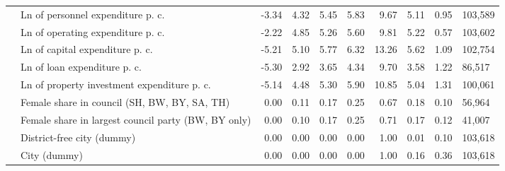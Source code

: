 \begin{tabular}{llrrrrrrrl}
   & Ln of personnel expenditure p. c. & -3.34 & 4.32 & 5.45 & 5.83 & 9.67 & 5.11 & 0.95 & 103,589 \\ 
   & Ln of operating expenditure p. c. & -2.22 & 4.85 & 5.26 & 5.60 & 9.81 & 5.22 & 0.57 & 103,602 \\ 
   & Ln of capital expenditure p. c. & -5.21 & 5.10 & 5.77 & 6.32 & 13.26 & 5.62 & 1.09 & 102,754 \\ 
   & Ln of loan expenditure p. c. & -5.30 & 2.92 & 3.65 & 4.34 & 9.70 & 3.58 & 1.22 & 86,517 \\ 
   & Ln of property investment expenditure p. c. & -5.14 & 4.48 & 5.30 & 5.90 & 10.85 & 5.04 & 1.31 & 100,061 \\ 
   & Female share in council (SH, BW, BY, SA, TH) & 0.00 & 0.11 & 0.17 & 0.25 & 0.67 & 0.18 & 0.10 & 56,964 \\ 
   & Female share in largest council party (BW, BY only) & 0.00 & 0.10 & 0.17 & 0.25 & 0.71 & 0.17 & 0.12 & 41,007 \\ 
   & District-free city (dummy) & 0.00 & 0.00 & 0.00 & 0.00 & 1.00 & 0.01 & 0.10 & 103,618 \\ 
   & City (dummy) & 0.00 & 0.00 & 0.00 & 0.00 & 1.00 & 0.16 & 0.36 & 103,618 \\ 
   \bottomrule
\end{tabular}
